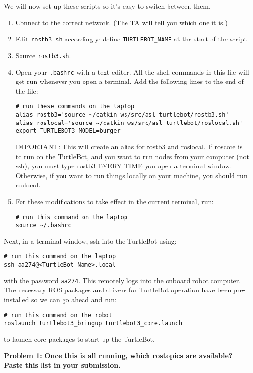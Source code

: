We will now set up these scripts so it's easy to switch between them.
\begin{enumerate}
	\item Connect to the correct network. (The TA will tell you which one it is.)
	\item Edit \texttt{rostb3.sh} accordingly: define \texttt{TURTLEBOT\_NAME} at the start of the script.
	\item Source \texttt{rostb3.sh}.
	\item Open your \texttt{.bashrc} with a text editor. All the shell commands in this file will get run whenever you open a terminal.
	Add the following lines to the end of the file:
	\begin{lstlisting}
# run these commands on the laptop
alias rostb3='source ~/catkin_ws/src/asl_turtlebot/rostb3.sh'
alias roslocal='source ~/catkin_ws/src/asl_turtlebot/roslocal.sh'
export TURTLEBOT3_MODEL=burger
	\end{lstlisting}
	
	IMPORTANT: This will create an alias for rostb3 and roslocal. If roscore is to run on the TurtleBot, and you want to run nodes from your computer (not ssh), you must type rostb3 EVERY TIME you open a terminal window. Otherwise, if you want to run things locally on your machine, you should run roslocal.
	\item For these modifications to take effect in the current terminal, run:
	\begin{lstlisting}
# run this command on the laptop
source ~/.bashrc
	\end{lstlisting}
\end{enumerate}

Next, in a terminal window, ssh into the TurtleBot using:
\begin{lstlisting}
# run this command on the laptop
ssh aa274@<TurtleBot Name>.local
\end{lstlisting}

with the password \texttt{aa274}. This remotely logs into the onboard robot computer. The necessary ROS packages
and drivers for TurtleBot operation have been pre-installed so we can go ahead and run:

\begin{lstlisting}
# run this command on the robot
roslaunch turtlebot3_bringup turtlebot3_core.launch	
\end{lstlisting}

to launch core packages to start up the TurtleBot.

{\bf Problem 1: Once this is all running, which rostopics are available? Paste this list in your submission.}
